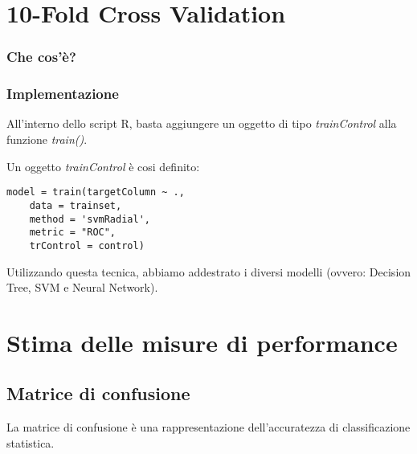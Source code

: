 \section{10-Fold Cross Validation}
\label{10fcv}
\subsubsection*{Che cos'è?}


\subsubsection*{Implementazione}

All'interno dello script R, basta aggiungere un oggetto di tipo \textit{trainControl} alla funzione \textit{train()}.

Un oggetto \textit{trainControl} è cosi definito:

\begin{lstlisting}[caption=Training con train control]
model = train(targetColumn ~ ., 
	data = trainset, 
	method = 'svmRadial',
	metric = "ROC", 
	trControl = control)
\end{lstlisting}

Utilizzando questa tecnica, abbiamo addestrato i diversi modelli (ovvero: Decision Tree, SVM e Neural Network).


\section{Stima delle misure di performance}



\subsection{Matrice di confusione}
La matrice di confusione è una rappresentazione dell'accuratezza di classificazione statistica.











